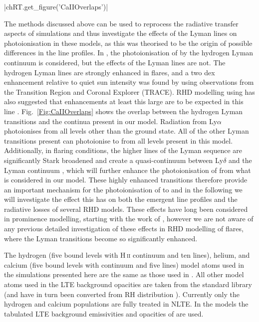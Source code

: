 \py[TimeDepRT]|chRT.get_figure('CaIIOverlaps')|

The methods discussed above can be used to reprocess the radiative transfer aspects of \Radyn{} simulations and thus investigate the effects of the Lyman lines on \Caii{} photoionisation in these models, as this was theorised to be the origin of possible differences in the \Caii{} line profiles.
In \Radyn{}, the photoionisation of \Caii{} by the hydrogen Lyman continuum is considered, but the effects of the Lyman lines are not.
The hydrogen Lyman lines are strongly enhanced in flares, and a two dex enhancement relative to quiet sun intensity was found by \citet{RubioDaCosta2009} using observations from the Transition Region and Coronal Explorer (TRACE).
RHD modelling using \Radyn{} has also suggested that enhancements at least this large are to be expected in this line \citep{Brown2018, Hong2019}.
Fig.~\ref{Fig:CaIIOverlaps} shows the overlap between the hydrogen Lyman transitions and the \Caii{} continua present in our model.
Radiation from Ly$\alpha$ photoionises \Caii{} from all levels other than the ground state.
All of the other Lyman transitions present can photoionise \Caii{} to \Caiii{} from all levels present in this model.
Additionally, in flaring conditions, the higher lines of the Lyman sequence are significantly Stark broadened and create a quasi-continuum between Ly$\delta$ and the Lyman continuum \citep{DeFeiter1975}, which will further enhance the photoionisation of \Caii{} from what is considered in our model.
These highly enhanced transitions therefore provide an important mechanism for the photoionisation of \Caii{} to \Caiii{} and in the following we will investigate the effect this has on both the emergent line profiles and the radiative losses of several RHD models.
These effects have long been considered in prominence modelling, starting with the work of \citet{Ishizawa1971}, however we are not aware of any previous detailed investigation of these effects in RHD modelling of flares, where the Lyman transitions become so significantly enhanced.

The hydrogen (five bound levels with H\,\textsc{ii} continuum and ten lines), helium, and calcium (five bound \Caii{} levels with \Caiii{} continuum and five lines) model atoms used in the simulations presented here are the same as those used in \Radyn{}.
All other model atoms used in the LTE background opacities are taken from the \Lw{} standard library (and have in turn been converted from  RH distribution \citep{Uitenbroek2001}).
Currently only the hydrogen and calcium populations are fully treated in NLTE.
In the \Radyn{} models the tabulated LTE background emissivities and opacities of \citet{Gustafsson1973} are used.

